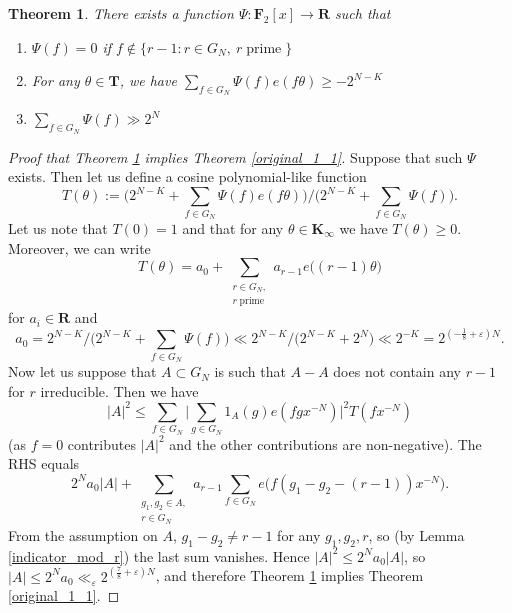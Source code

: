 \documentclass[11pt, reqno]{amsart}
\newtheorem{theorem}{Theorem}[section]
\numberwithin{equation}{section}
\newcommand\eps{\varepsilon}
\newcommand\pprime{\operatorname{prime}}
\begin{document}
\begin{theorem}
\label{original_2_1}
    There exists a function $\Psi: \mathbf{F}_2[x] \rightarrow \mathbf{R}$ such that
    \begin{enumerate}
        \item $\Psi(f)=0$ if $f \notin \{r-1 : r \in G_N, \ r \pprime\}$
        \item For any $\theta \in \mathbf{T}$, we have $\sum_{f \in G_N} \Psi(f) e (f\theta) \geqslant -2^{N-K}$
        \item $\sum_{f \in G_N} \Psi(f) \gg 2^N$
    \end{enumerate}
\end{theorem}

\begin{proof}[Proof that Theorem \ref{original_2_1} implies Theorem \ref{original_1_1}]
    Suppose that such $\Psi$ exists. Then let us define a cosine polynomial-like function
    \begin{equation}
        T(\theta):=\Big( 2^{N-K} + \sum_{f \in G_N} \Psi(f) e(f\theta) \Big) \Big/ \Big( 2^{N-K} + \sum_{f \in G_N} \Psi(f) \Big).
    \end{equation}
    Let us note that $T(0)=1$ and that for any $\theta \in \mathbf{K}_{\infty}$ we have $T(\theta) \geqslant 0$. Moreover, we can write
    \begin{equation}
        T(\theta)=a_0+\sum_{\substack{r \in G_N, \\ r \pprime}} a_{r-1} e \big((r-1)\theta\big)
    \end{equation}
    for $a_i \in \mathbf{R}$ and
    \begin{equation}
        a_0=2^{N-K} \Big/ \Big( 2^{N-K} + \sum_{f \in G_N} \Psi(f) \Big) \ll 2^{N-K} \Big/ \Big( 2^{N-K}+2^N \Big) \ll 2^{-K}=2^{(-\frac{1}{8}+\eps)N}.
    \end{equation}
    Now let us suppose that $A \subset G_N$ is such that $A-A$ does not contain any $r-1$ for $r$ irreducible. Then we have
    $$|A|^2 \leqslant \sum_{f \in G_{N}} \bigg| \sum_{g \in G_N} 1_A(g) e(fg x^{-N}) \bigg|^2 T(f x^{-N})$$ (as $f=0$ contributes $|A|^2$ and the other contributions are non-negative). The RHS equals
    $$2^Na_0|A| + \sum_{\substack{g_1, g_2 \in A, \\ r \in G_N}} a_{r-1}\sum_{f \in G_{N}} e\big(f(g_1-g_2-(r-1))x^{-N}\big).$$
    From the assumption on $A$, $g_1 - g_2 \neq r-1$ for any $g_1, g_2, r$, so (by Lemma \ref{indicator_mod_r}) the last sum vanishes. Hence $|A|^2 \leqslant 2^Na_0|A|$, so $|A| \leqslant 2^N a_0 \ll_{\eps} 2^{( \frac{7}{8} + \eps )N}$, and therefore Theorem \ref{original_2_1} implies Theorem \ref{original_1_1}.
\end{proof}
\end{document}
